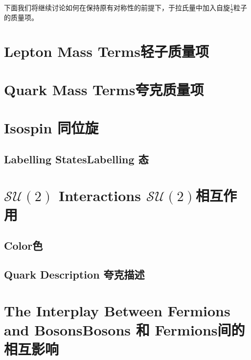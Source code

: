 下面我们将继续讨论如何在保持原有对称性的前提下，于拉氏量中加入自旋$\frac{1}{2}$粒子的质量项。

\section[轻子质量项]{Lepton Mass Terms\quad 轻子质量项}\label{sec7.5}

\section[夸克质量项]{Quark Mass Terms\quad 夸克质量项}\label{sec7.6}

\section[同位旋]{Isospin \quad 同位旋}\label{sec7.7}

\subsection[Labelling 态]{Labelling States\quad Labelling 态}\label{sec7.7.1}

\section[$\mathcal{SU}(3)$相互作用]{$\mathcal{SU}(2)$ Interactions \quad $\mathcal{SU}(2)$相互作用}\label{sec7.8}

\subsection[色]{Color\quad 色}\label{sec7.8.1}

\subsection[夸克描述]{Quark Description \quad 夸克描述}\label{sec7.8.2}

\section[Bosons 和 Fermions 间的相互影响]{The Interplay Between Fermions and Bosons\quad Bosons 和 Fermions间的相互影响}\label{sec7.9}
